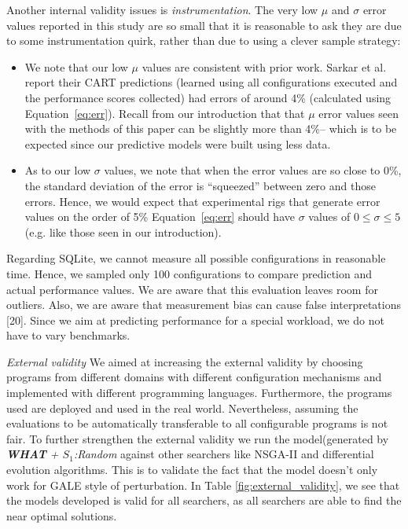 \documentclass{sig-alternative}
\newcommand{\bi}{\begin{itemize}}%
\newcommand{\ei}{\end{itemize}}
\newcommand{\eq}[1]{Equation~\ref{eq:#1}}
\newcommand{\what}{{\bf WHAT }}
\begin{document}
Another internal validity issues is {\em instrumentation}. The very low $\mu$ and $\sigma$ error values
reported in this study are so small that it is reasonable to ask they are due to some instrumentation
quirk, rather than due to using a clever sample strategy:
\bi
\item
We note that our low $\mu$ values are consistent with prior work.  Sarkar et al.~\cite{sarkar2015cost} report their CART predictions
(learned using all configurations executed and the performance scores collected) had  errors of around 4\% (calculated using \eq{err}). Recall from our introduction that that  $\mu$ error values  seen with the methods of this paper
can be slightly more than 4\%-- which is to be expected since our predictive models were built using less
data. 
\item
As to our low $\sigma$ values, we note that when the  error values are so close to 0\%, the standard
deviation of the error is ``squeezed'' between zero and those errors. Hence, we would expect that
experimental rigs
that generate error values on the order of 5\% \eq{err} should have $\sigma$ values of $0\le \sigma \le 5$ (e.g. like those seen in our introduction).
\ei

Regarding SQLite, we cannot measure all possible configurations in reasonable time. Hence, we sampled only 100 configurations to compare prediction and actual performance values. We are aware that this evaluation leaves room for outliers.
Also, we are aware that measurement bias can cause false interpretations [20]. Since we aim at predicting performance for a special workload, we do not have to vary benchmarks.



{\em External validity}  We aimed at increasing the external validity by choosing programs from different domains with different configuration mechanisms and implemented with different programming languages. Furthermore, the programs used are deployed and used in the real world. Nevertheless, assuming the evaluations to be automatically transferable  to all configurable programs is not fair. To further strengthen the external validity we run the model(generated by \textit{\what + $S_1$:Random} against other searchers like NSGA-II and differential evolution algorithms\cite{storn1997differential}. This is to validate the fact that the model doesn't only work for GALE style of perturbation. In Table \ref{fig:external_validity}, we see that the models developed is valid for all searchers, as all searchers are able to find the near optimal solutions.
\end{document}
